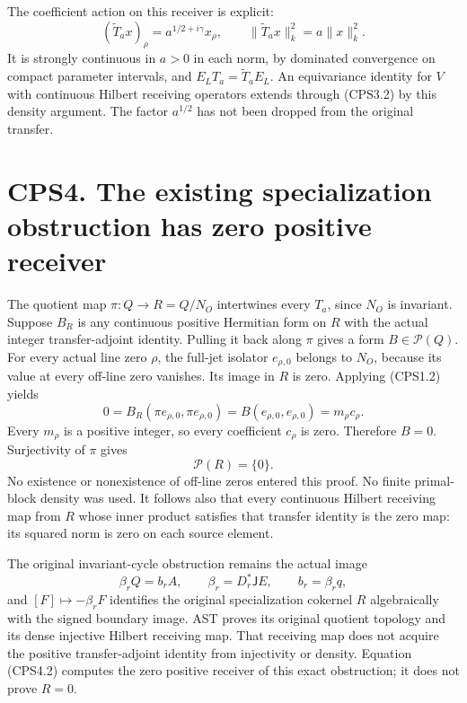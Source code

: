 The coefficient action on this receiver is explicit: \[
(\widetilde T_a x)_\rho=a^{1/2+i\gamma}x_\rho,
\qquad
\|\widetilde T_a x\|_k^2=a\|x\|_k^2.
\tag{CPS3.3}
\] It is strongly continuous in \(a>0\) in each norm, by dominated
convergence on compact parameter intervals, and
\(E_LT_a=\widetilde T_aE_L\). An equivariance identity for \(V\) with
continuous Hilbert receiving operators extends through (CPS3.2) by this
density argument. The factor \(a^{1/2}\) has not been dropped from the
original transfer.

\section{CPS4. The existing specialization obstruction has zero positive
receiver}\label{cps4.-the-existing-specialization-obstruction-has-zero-positive-receiver}

The quotient map \(\pi:Q\to R=Q/N_O\) intertwines every \(T_a\), since
\(N_O\) is invariant. Suppose \(B_R\) is any continuous positive
Hermitian form on \(R\) with the actual integer transfer-adjoint
identity. Pulling it back along \(\pi\) gives a form
\(B\in\mathscr P(Q)\). For every actual line zero \(\rho\), the full-jet
isolator \(e_{\rho,0}\) belongs to \(N_O\), because its value at every
off-line zero vanishes. Its image in \(R\) is zero. Applying (CPS1.2)
yields \[
0=B_R(\pi e_{\rho,0},\pi e_{\rho,0})
=B(e_{\rho,0},e_{\rho,0})=m_\rho c_\rho.
\tag{CPS4.1}
\] Every \(m_\rho\) is a positive integer, so every coefficient
\(c_\rho\) is zero. Therefore \(B=0\). Surjectivity of \(\pi\) gives \[
\boxed{\mathscr P(R)=\{0\}.}
\tag{CPS4.2}
\] No existence or nonexistence of off-line zeros entered this proof. No
finite primal-block density was used. It follows also that every
continuous Hilbert receiving map from \(R\) whose inner product
satisfies that transfer identity is the zero map: its squared norm is
zero on each source element.

The original invariant-cycle obstruction remains the actual image \[
\beta_rQ=b_rA,\qquad
\beta_r=D_r^*\mathsf JE,\qquad b_r=\beta_rq,
\tag{CPS4.3}
\] and \([F]\mapsto-\beta_rF\) identifies the original specialization
cokernel \(R\) algebraically with the signed boundary image. AST proves
its original quotient topology and its dense injective Hilbert receiving
map. That receiving map does not acquire the positive transfer-adjoint
identity from injectivity or density. Equation (CPS4.2) computes the
zero positive receiver of this exact obstruction; it does not prove
\(R=0\).

